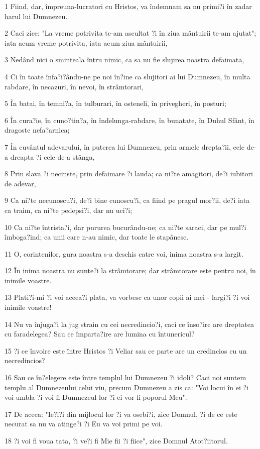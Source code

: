 \par 1 Fiind, dar, împreuna-lucratori cu Hristos, va îndemnam sa nu primi?i în zadar harul lui Dumnezeu.
\par 2 Caci zice: "La vreme potrivita te-am ascultat ?i în ziua mântuirii te-am ajutat"; iata acum vreme potrivita, iata acum ziua mântuirii,
\par 3 Nedând nici o sminteala întru nimic, ca sa nu fie slujirea noastra defaimata,
\par 4 Ci în toate înfa?i?ându-ne pe noi în?ine ca slujitori ai lui Dumnezeu, în multa rabdare, în necazuri, în nevoi, în strâmtorari,
\par 5 În batai, în temni?a, în tulburari, în osteneli, în privegheri, în posturi;
\par 6 În cura?ie, în cuno?tin?a, în îndelunga-rabdare, în bunatate, în Duhul Sfânt, în dragoste nefa?arnica;
\par 7 În cuvântul adevarului, în puterea lui Dumnezeu, prin armele drepta?ii, cele de-a dreapta ?i cele de-a stânga,
\par 8 Prin slava ?i necinste, prin defaimare ?i lauda; ca ni?te amagitori, de?i iubitori de adevar,
\par 9 Ca ni?te necunoscu?i, de?i bine cunoscu?i, ca fiind pe pragul mor?ii, de?i iata ca traim, ca ni?te pedepsi?i, dar nu uci?i;
\par 10 Ca ni?te întrista?i, dar pururea bucurându-ne; ca ni?te saraci, dar pe mul?i îmboga?ind; ca unii care n-au nimic, dar toate le stapânesc.
\par 11 O, corintenilor, gura noastra s-a deschis catre voi, inima noastra s-a largit.
\par 12 În inima noastra nu sunte?i la strâmtorare; dar strâmtorare este pentru noi, în inimile voastre.
\par 13 Plati?i-mi ?i voi aceea?i plata, va vorbesc ca unor copii ai mei - largi?i ?i voi inimile voastre!
\par 14 Nu va înjuga?i la jug strain cu cei necredincio?i, caci ce înso?ire are dreptatea cu faradelegea? Sau ce împarta?ire are lumina cu întunericul?
\par 15 ?i ce învoire este între Hristos ?i Veliar sau ce parte are un credincios cu un necredincios?
\par 16 Sau ce în?elegere este între templul lui Dumnezeu ?i idoli? Caci noi suntem templu al Dumnezeului celui viu, precum Dumnezeu a zis ca: "Voi locui în ei ?i voi umbla ?i voi fi Dumnezeul lor ?i ei vor fi poporul Meu".
\par 17 De aceea: "Ie?i?i din mijlocul lor ?i va osebi?i, zice Domnul, ?i de ce este necurat sa nu va atinge?i ?i Eu va voi primi pe voi.
\par 18 ?i voi fi voua tata, ?i ve?i fi Mie fii ?i fiice", zice Domnul Atot?iitorul.


